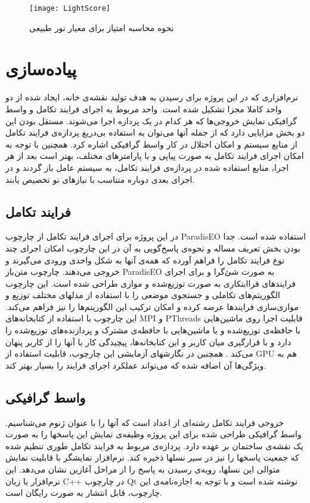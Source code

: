 \documentclass{report}
\begin{document}
\begin{figure}[h] \centerline{\texttt{[image: LightScore]}} \caption{\label{fLightScore}
نحوه محاسبه امتیاز برای معیار نور طبیعی
 } \end{figure}

\section{پیاده‌سازی}
نرم‌افزاری که در این پروژه برای رسیدن به هدف تولید نقشه‌ی خانه، ایجاد شده از دو واحد کاملا مجزا تشکیل شده است. واحد مربوط به اجرای فرایند تکامل و واسط گرافیکی نمایش خروجی‌ها که هر کدام در یک پردازه اجرا می‌شوند. مستقل بودن این دو بخش مزایایی دارد که از جمله آنها می‌توان به استفاده بی‌دریغ پردازه‌ی فرایند تکامل از منابع سیستم و امکان اختلال در کار واسط گرافیکی اشاره کرد. همچنین با توجه به امکان اجرای فرایند تکامل به صورت پیاپی و با پارامترهای مختلف، بهتر است بعد از هر اجرا، منابع استفاده شده در پردازه‌ی فرایند تکامل، به سیستم عامل باز گردند و در اجرای بعدی دوباره متناسب با نیازهای نو تخصیص یابند.

\subsection{فرایند تکامل}
در این پروژه برای اجرای فرایند تکامل از چارچوب ParadisEO استفاده شده است. جدا بودن بخش تعریف مساله و نحوه‌ی پاسخ‌گویی به آن در این چارچوب امکان اجرای چند نوع فرایند تکامل را فراهم آورده که همه‌ی آنها به شکل واحدی ورودی می‌گیرند و خروجی می‌دهند.
چارچوب متن‌باز ParadisEO به صورت شئ‌گرا و برای اجرای فرایندهای فراابتکاری به صورت توزیع‌شده و موازی طراحی شده است. این چارچوب الگوریتم‌های تکاملی و جستجوی موضعی را با استفاده از مدلهای مختلف توزیع و موازی‌سازی فرایندها عرضه کرده و امکان ترکیب این الگوریتم‌ها را نیز فراهم می‌کند. 
این چارچوب با استفاده از کتابخانه‌های MPI و PThreads قابلیت اجرا روی ماشین‌هایی با حافظه‌ی توزیع‌شده و یا ماشین‌هایی با حافظه‌ی مشترک و پردازنده‌های توزیع‌شده را دارد و با قرارگیری میان کاربر و این کتابخانه‌ها، پیچیدگی کار با آنها را از کاربر پنهان می‌کند \cite{cahon_paradiseo}. همچنین در نگارشهای آزمایشی این چارچوب، قابلیت استفاده از GPU هم به ویژگی‌ها آن اضافه شده که می‌تواند عملکرد اجرای فرایند را بسیار بهتر کند.
 
\subsection{واسط گرافیکی}
خروجی فرایند تکامل رشته‌ای از اعداد است که آنها را با عنوان ژنوم می‌شناسیم. واسط گرافیکی طراحی شده برای این پروژه وظیفه‌ی نمایش این پاسخها را به صورت یک نقشه‌ی ساختمان بر عهده دارد. پردازه‌ی مربوط به فرایند تکامل طوری تنظیم شده که جمعیت پاسخها را نیز در سیر نسلها ذخیره کند. نرم‌افزار نمایشگر با قابلیت نمایش متوالی این نسلها، رویه‌ی رسیدن به پاسخ را از مراحل آغازین نشان می‌دهد. این نرم‌افزار با زبان C++ در چارچوب Qt نوشته شده است و با توجه به اجازه‌نامه‌ی این چارچوب، قابل انتشار به صورت رایگان است.
\end{document}
